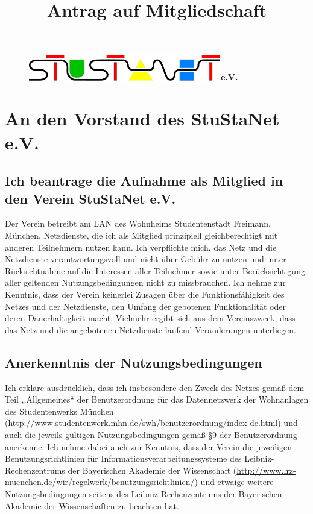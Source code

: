 \documentclass[a4paper,12pt]{scrartcl}
\title{Antrag auf Mitgliedschaft}
\date{}
\begin{document}
\maketitle
\vspace{-60pt}

\begin{figure}[t!]
   \centering
   \mbox{\includegraphics[width=0.75\textwidth,keepaspectratio]{stunetp}\Huge \sffamily \textbf{e.V.}}
   \vspace{-40pt}
\end{figure}


\section*{An den Vorstand des StuStaNet e.V.}

\subsection*{Ich beantrage die Aufnahme als Mitglied in den Verein StuStaNet e.V.}
Der Verein betreibt am LAN des Wohnheims Studentenstadt Freimann, München, Netzdienste, die ich als Mitglied prinzipiell gleichberechtigt mit anderen Teilnehmern nutzen kann. Ich verpflichte mich, das Netz und die Netzdienste verantwortungsvoll und nicht über Gebühr zu nutzen und unter Rücksichtnahme auf die Interessen aller Teilnehmer sowie unter Berücksichtigung aller geltenden Nutzungsbedingungen nicht zu missbrauchen. Ich nehme zur Kenntnis, dass der Verein keinerlei Zusagen über die Funktionsfähigkeit des Netzes und der Netzdienste, den Umfang der gebotenen Funktionalität oder deren Dauerhaftigkeit macht. Vielmehr ergibt sich aus dem Vereinszweck, dass das Netz und die angebotenen Netzdienste laufend Veränderungen unterliegen.

\subsection*{Anerkenntnis der Nutzungsbedingungen}
Ich erkläre ausdrücklich, dass ich insbesondere den Zweck des Netzes gemäß dem Teil ,,Allgemeines`` der Benutzerordnung für das Datennetzwerk der Wohnanlagen des Studentenwerks München (\url{http://www.studentenwerk.mhn.de/swh/benutzerordnung/index-de.html}) 
und auch die jeweils gültigen Nutzungsbedingungen gemäß §9 der Benutzerordnung anerkenne. Ich nehme dabei auch zur Kenntnis, dass der Verein die jeweiligen Benutzungsrichtlinien für Informationsverarbeitungssysteme des Leibniz-Rechenzentrums der Bayerischen Akademie der Wissenschaft (\url{http://www.lrz-muenchen.de/wir/regelwerk/benutzungsrichtlinien/}) 
und etwaige weitere Nutzungsbedingungen seitens des Leibniz-Rechenzentrums der Bayerischen Akademie der Wissenschaften zu beachten hat.
\end{document}

